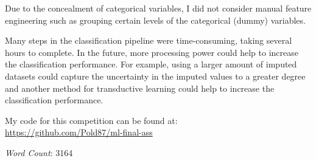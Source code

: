 \documentclass[a4paper]{article}
\begin{document}
Due to the concealment of categorical variables, I did not consider
manual feature engineering such as grouping certain levels of the
categorical (dummy) variables.

Many steps in the classification pipeline were time-consuming, taking
several hours to complete. In the future, more processing power could
help to increase the classification performance. For example, using a
larger amount of imputed datasets could capture the uncertainty in the
imputed values to a greater degree and another method for
transductive learning could help to increase the classification performance.

My code for this competition can be found at:\\
\url{https://github.com/Pold87/ml-final-ass}

\noindent \emph{Word Count}: 3164

\printbibliography
\end{document}
